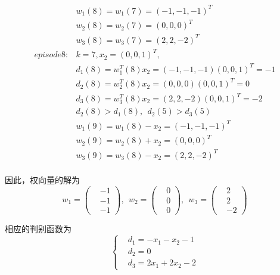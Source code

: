\documentclass[a4paper, UTF8, 12pt]{ctexart}
\begin{document}
\begin{align*}
            &w_1(8)=w_1(7)=(-1,-1,-1)^T \\
            &w_2(8)=w_2(7)=(0,0,0)^T \\
            &w_3(8)=w_3(7)=(2,2,-2)^T \\
          episode8: &k=7,x_2 = {\left(0,0,1\right)}^T ,\\
            &d_1(8)=w_1^T(8)x_2=(-1,-1,-1)(0,0,1)^T=-1 \\
            &d_2(8)=w_2^T(8)x_2=(0,0,0)(0,0,1)^T=0 \\
            &d_3(8)=w_3^T(8)x_2=(2,2,-2)(0,0,1)^T=-2 \\
            & d_2(8) > d_1(8) ,\ \  d_2(5) > d_3(5) \\
            &w_1(9)=w_1(8)-x_2=(-1,-1,-1)^T \\
            &w_2(9)=w_2(8)+x_2=(0,0,0)^T \\
            &w_3(9)=w_3(8)-x_2=(2,2,-2)^T \\
        \end{align*}

        因此，权向量的解为
        \begin{equation*}
            w_1=\left(
                \begin{aligned}
                & -1 \\ &-1 \\ &-1
                \end{aligned} 
            \right) , \ \  
            w_2=\left(
                \begin{aligned}
                    & 0 \\ &0 \\ &0
                \end{aligned} 
            \right), \ \  
            w_3=\left(
                \begin{aligned}
                    & 2 \\ &2 \\ &-2
                \end{aligned} 
            \right)
        \end{equation*}

        相应的判别函数为
        $$\left\{
                \begin{aligned}
                    &d_1 = -x_1-x_2-1 \\
                    &d_2 = 0 \\ 
                    &d_3 = 2x_1+2x_2-2
                \end{aligned} 
            \right.
        $$ \\
\end{document}
